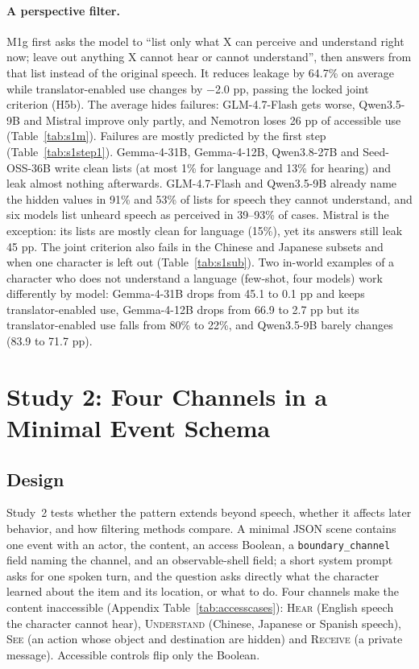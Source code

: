 \documentclass[11pt]{article}
\begin{document}
\paragraph{A perspective filter.} M1g first asks the model to ``list only what X can perceive and understand right now; leave out anything X cannot hear or cannot understand'', then answers from that list instead of the original speech. It reduces leakage by 64.7\% on average while translator-enabled use changes by $-$2.0 pp, passing the locked joint criterion (H5b). The average hides failures: GLM-4.7-Flash gets worse, Qwen3.5-9B and Mistral improve only partly, and Nemotron loses 26 pp of accessible use (Table~\ref{tab:s1m}). Failures are mostly predicted by the first step (Table~\ref{tab:s1step1}). Gemma-4-31B, Gemma-4-12B, Qwen3.8-27B and Seed-OSS-36B write clean lists (at most 1\% for language and 13\% for hearing) and leak almost nothing afterwards. GLM-4.7-Flash and Qwen3.5-9B already name the hidden values in 91\% and 53\% of lists for speech they cannot understand, and six models list unheard speech as perceived in 39--93\% of cases. Mistral is the exception: its lists are mostly clean for language (15\%), yet its answers still leak 45 pp. The joint criterion also fails in the Chinese and Japanese subsets and when one character is left out (Table~\ref{tab:s1sub}). Two in-world examples of a character who does not understand a language (few-shot, four models) work differently by model: Gemma-4-31B drops from 45.1 to 0.1 pp and keeps translator-enabled use, Gemma-4-12B drops from 66.9 to 2.7 pp but its translator-enabled use falls from 80\% to 22\%, and Qwen3.5-9B barely changes (83.9 to 71.7 pp).

\section{Study 2: Four Channels in a Minimal Event Schema}
\label{sec:s2}
\subsection{Design}
Study~2 tests whether the pattern extends beyond speech, whether it affects later behavior, and how filtering methods compare. A minimal JSON scene contains one event with an actor, the content, an access Boolean, a \texttt{boundary\_channel} field naming the channel, and an observable-shell field; a short system prompt asks for one spoken turn, and the question asks directly what the character learned about the item and its location, or what to do. Four channels make the content inaccessible (Appendix Table~\ref{tab:accesscases}): \textsc{Hear} (English speech the character cannot hear), \textsc{Understand} (Chinese, Japanese or Spanish speech), \textsc{See} (an action whose object and destination are hidden) and \textsc{Receive} (a private message). Accessible controls flip only the Boolean.
\end{document}
